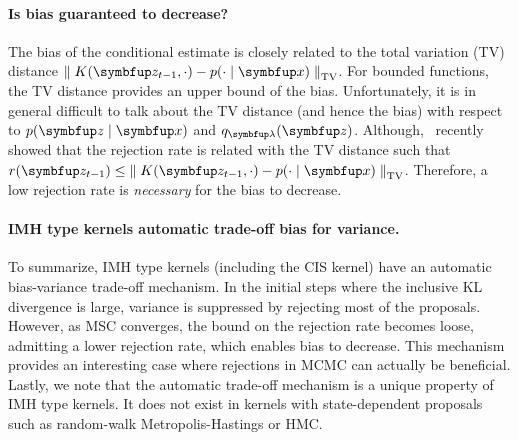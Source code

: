 \paragraph{Is bias guaranteed to decrease?}
The bias of the conditional estimate is closely related to the total variation (TV) distance \(\DTV{K(\vz_{t-1}, \cdot)}{p(\cdot\mid\vx)}\).
For bounded functions, the TV distance provides an upper bound of the bias.
Unfortunately, it is in general difficult to talk about the TV distance (and hence the bias) with respect to \(p(\vz\mid\vx)\) and \(q_{\vlambda}(\vz)\).
Although,~\citet{wang_exact_2020} recently showed that the rejection rate is related with the TV distance such that \(r(\vz_{t-1}) \leq \DTV{K(\vz_{t-1}, \cdot)}{p(\cdot\mid\vx)}\).
Therefore, a low rejection rate is \textit{necessary} for the bias to decrease.

\vspace{-0.1in}
\paragraph{IMH type kernels automatic trade-off bias for variance.}
To summarize, IMH type kernels (including the CIS kernel) have an automatic bias-variance trade-off mechanism.
In the initial steps where the inclusive KL divergence is large, variance is suppressed by rejecting most of the proposals.
However, as MSC converges, the bound on the rejection rate becomes loose, admitting a lower rejection rate, which enables bias to decrease.
This mechanism provides an interesting case where rejections in MCMC can actually be beneficial.
Lastly, we note that the automatic trade-off mechanism is a unique property of IMH type kernels.
It does not exist in kernels with state-dependent proposals such as random-walk Metropolis-Hastings or HMC.



